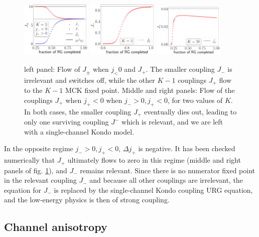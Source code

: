 \documentclass[reprint,prb,superscriptaddress]{revtex4-2}
\begin{document}
\begin{figure}[!htpb]
	\centering
	\includegraphics[width=0.3\textwidth]{plt/K to K-1.pdf}
	\includegraphics[width=0.3\textwidth]{plt/irr_Jp_K=3.pdf}
	\includegraphics[width=0.3\textwidth]{plt/irr_Jp_K=50.pdf}
	\caption{left panel: Flow of \(J_\pm\) when \(j_< 0\) and \(J_+\). The smaller coupling \(J_-\) is irrelevant and switches off, while the other \(K-1\) couplings \(J_+\) flow to the \(K-1\) MCK fixed point. Middle and right panels: Flow of the couplings \(J_+\) when \(j_+ < 0\) when \(j_- > 0, j_+ < 0\), for two values of \(K\). In both cases, the smaller coupling \(J_+\) eventually dies out, leading to only one surviving coupling \(J^-\) which is relevant, and we are left with a single-channel Kondo model.}
	\label{K_to_K-1}
\end{figure}

In the opposite regime \(j_- > 0, j_+ < 0\), \(\Delta j_+\) is negative. It has been checked numerically that \(J_+\) ultimately flows to zero in this regime (middle and right panels of fig. \ref{K_to_K-1}), and \(J_-\) remains relevant. Since there is no numerator fixed point in the relevant coupling \(J_-\) and because all other couplings are irrelevant, the equation for \(J_-\) is replaced by the single-channel Kondo coupling URG equation, and the low-energy physics is then of strong coupling.


\subsection{Channel anisotropy}
\end{document}
